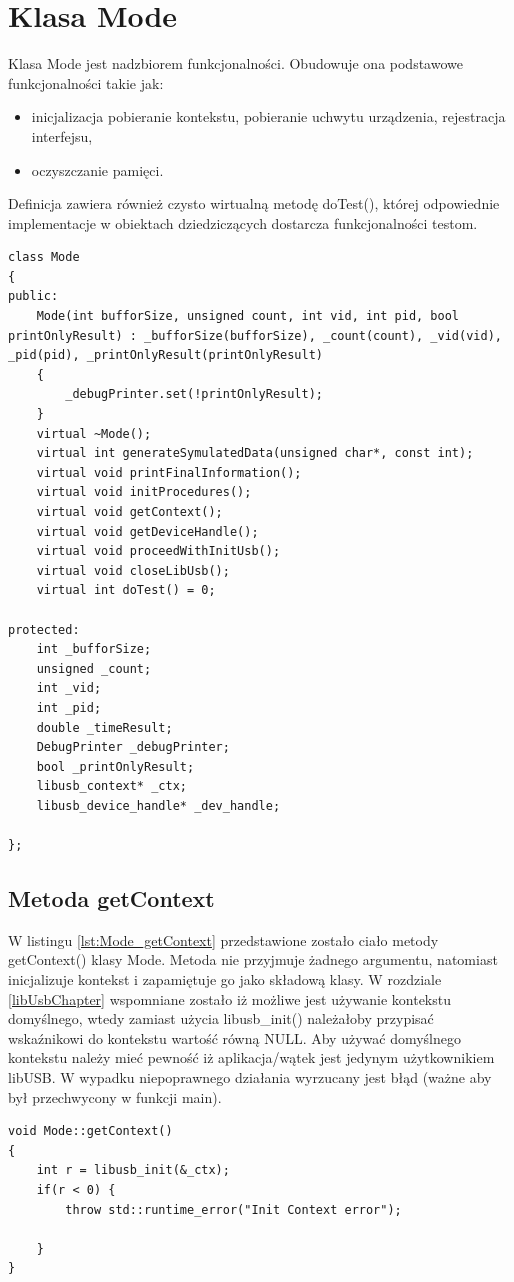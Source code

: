 \documentclass{BscUS}
\begin{document}
\section{Klasa Mode}
Klasa Mode jest nadzbiorem funkcjonalności. Obudowuje ona podstawowe funkcjonalności takie jak:
\begin{itemize}
\item inicjalizacja
\subitem pobieranie kontekstu,
\subitem pobieranie uchwytu urządzenia,
\subitem rejestracja interfejsu,
\item oczyszczanie pamięci.
\end{itemize}
Definicja zawiera również czysto wirtualną metodę doTest(), której odpowiednie implementacje w obiektach dziedziczących dostarcza funkcjonalności testom.
\begin{lstlisting}[caption={Deklaracja klasy Mode},label={lst:CMode}]
class Mode
{
public:
	Mode(int bufforSize, unsigned count, int vid, int pid, bool printOnlyResult) : _bufforSize(bufforSize), _count(count), _vid(vid), _pid(pid), _printOnlyResult(printOnlyResult)
	{
		_debugPrinter.set(!printOnlyResult);
	}
	virtual ~Mode();
	virtual int generateSymulatedData(unsigned char*, const int);
	virtual void printFinalInformation();
	virtual void initProcedures();
	virtual void getContext();
	virtual void getDeviceHandle();
	virtual void proceedWithInitUsb();
	virtual void closeLibUsb();
	virtual int doTest() = 0;
	
protected:
	int _bufforSize;
	unsigned _count;
	int _vid;
	int _pid;
	double _timeResult;
	DebugPrinter _debugPrinter;
	bool _printOnlyResult;
	libusb_context* _ctx;
	libusb_device_handle* _dev_handle;

};
\end{lstlisting}
\subsection{Metoda getContext}
W listingu \ref{lst:Mode_getContext} przedstawione zostało ciało metody getContext() klasy Mode.
\newline
Metoda nie przyjmuje żadnego argumentu, natomiast inicjalizuje kontekst i zapamiętuje go jako składową klasy. W rozdziale \ref{libUsbChapter} wspomniane zostało iż możliwe jest używanie kontekstu domyślnego, wtedy zamiast użycia libusb\_init() należałoby przypisać wskaźnikowi do kontekstu wartość równą NULL. 
\newline
Aby używać domyślnego kontekstu należy mieć pewność iż aplikacja/wątek jest jedynym użytkownikiem libUSB.
\newline
W wypadku niepoprawnego działania wyrzucany jest błąd (ważne aby był przechwycony w funkcji main).
\begin{lstlisting}[caption={Metoda Mode::getContext()},label={lst:Mode_getContext}]
void Mode::getContext()
{	
	int r = libusb_init(&_ctx);
	if(r < 0) {
		throw std::runtime_error("Init Context error");

	}
}
\end{lstlisting}
\end{document}
